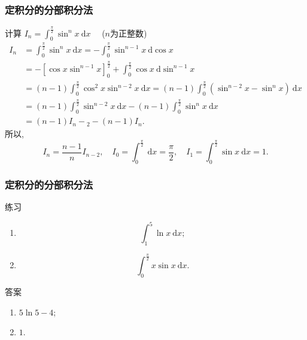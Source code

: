 \documentclass[
10pt,
aspectratio=43,
]{beamer}
\begin{document}
\begin{frame}
	\frametitle{定积分的分部积分法}
	\everymath{\displaystyle}
	{\small
		\begin{block}{计算 $I_n=\int_0^{\frac{\pi}{2}} \sin ^n x \mathrm{~d} x\quad$ ($n$为正整数) }
			$$
				\begin{aligned}
					I_n & =\int_0^{\frac{\pi}{2}} \sin ^n x \mathrm{~d} x=-\int_0^{\frac{\pi}{2}} \sin ^{n-1} x \mathrm{~d} \cos x                                           \\
					    & =-\left[\cos x \sin ^{n-1} x\right]_0^{\frac{\pi}{2}}+\int_0^{\frac{\pi}{2}} \cos x \mathrm{~d} \sin ^{n-1} x                                      \\
					    & =(n-1) \int_0^{\frac{\pi}{2}} \cos ^2 x \sin ^{n-2} x \mathrm{~d} x=(n-1) \int_0^{\frac{\pi}{2}}\left(\sin ^{n-2} x-\sin ^n x\right) \mathrm{~d} x \\
					    & =(n-1) \int_0^{\frac{\pi}{2}} \sin ^{n-2} x \mathrm{~d} x-(n-1) \int_0^{\frac{\pi}{2}} \sin ^n x \mathrm{~d} x                                     \\
					    & =(n-1) I_n-{ }_2-(n-1) I_n.
				\end{aligned}
			$$
			所以,
			$$
				I_n=\frac{n-1}{n} I_{n-2},\quad I_0=\int_0^{\frac{\pi}{2}} \mathrm{~d} x=\frac{\pi}{2}, \quad I_1=\int_0^{\frac{\pi}{2}} \sin x \mathrm{~d} x=1.
			$$
		\end{block}
	}
\end{frame}

\begin{frame}
	\frametitle{定积分的分部积分法}
	\everymath{\displaystyle}
	\begin{block}{练习}
		\begin{enumerate}
			\item
			      $$
				      \int_1^5 \ln x  \mathrm{~d} x;
			      $$
			\item
			      $$
				      \int_0^{\frac{\pi}{2}} x \sin x \mathrm{~d} x.
			      $$
		\end{enumerate}
	\end{block}
	\pause
	\begin{exampleblock}{答案}
		\begin{enumerate}[<+->]
			\item $5\ln 5-4$;\vspace{0.5cm}
			\item $1$.
		\end{enumerate}
	\end{exampleblock}
\end{frame}
\end{document}
